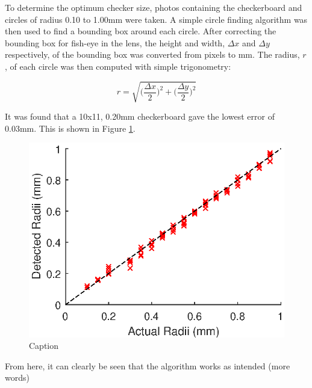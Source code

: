 \documentclass{physics_article_B}
\begin{document}
        To determine the optimum checker size, photos containing the checkerboard and circles of radius 0.10 to 1.00mm were taken. A simple circle finding algorithm was then used to find a bounding box around each circle. After correcting the bounding box for fish-eye in the lens, the height and width, $\Delta x$ and $\Delta y$ respectively, of the bounding box was converted from pixels to mm. The radius, $r$, of each circle was then computed with simple trigonometry:
        
        \begin{equation}\label{eq:radii}
            r = \sqrt{\Big(\frac{\Delta x}{2}\Big)^2 + \Big(\frac{\Delta y}{2}\Big)^2}
        \end{equation}
        
        \vspace{3pt} It was found that a 10x11, 0.20mm checkerboard gave the lowest error of 0.03mm. This is shown in Figure \ref{fig:calibsize}. 
        
        \begin{figure}[H]
            \centering
            \includegraphics{Figures/CameraCalib.eps}
            \caption{Caption}
            \label{fig:calibsize}
        \end{figure}
        
        From here, it can clearly be seen that the algorithm works as intended (more words)
        
\end{document}
